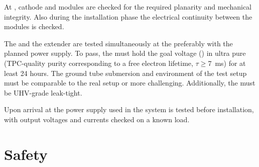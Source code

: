 At \surf, cathode and  modules are checked for the required planarity and mechanical integrity. Also during the installation phase  the electrical continuity between the modules is checked.

The \fdth and the  extender are tested simultaneously at the  
preferably with the planned %
power supply.  To pass, the \fdth must hold the goal voltage (\dptargetdriftvoltneg{}) in ultra pure \lar (TPC-quality purity corresponding to a free electron lifetime, $\tau\geq$\SI{7}{\ms}) for at least \num{24} hours. The ground tube submersion and \efield environment of the test setup must be comparable to the real  setup or more challenging.  Additionally, the \fdth must be UHV-grade leak-tight.

Upon arrival at \surf the power supply used in the   system is tested before installation, with  output voltages and currents checked on a known load. 

\section{Safety}
\label{sec:fddp-hv-safety}



